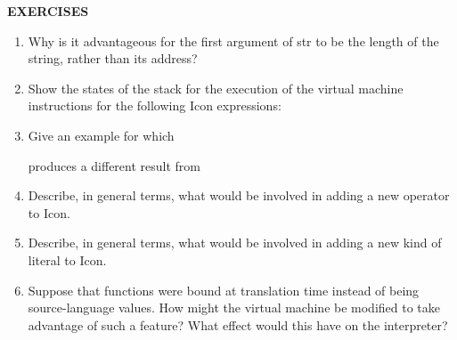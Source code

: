 \bigskip

\noindent\textbf{EXERCISES}

\liststyleLvi
\begin{enumerate}
\item Why is it advantageous for the first argument of str to be the
length of the string, rather than its address?

\item Show the states of the stack for the execution of the virtual
machine instructions for the following Icon expressions:


\item Give an example for which


produces a different result from


\item Describe, in general terms, what would be involved in adding a
new operator to Icon.

\item Describe, in general terms, what would be involved in adding a
new kind of literal to Icon.

\item Suppose that functions were bound at translation time instead of
being source-language values. How might the virtual machine be
modified to take advantage of such a feature?  What effect would this
have on the interpreter?

\end{enumerate}
